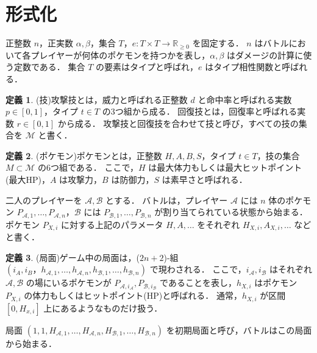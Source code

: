 \documentclass{jsarticle}
\theoremstyle{definition}
\newtheorem{definition}{定義}
\begin{document}
\section{形式化}
正整数 $n$，正実数 $\alpha,\beta$，集合 $T$，$e\colon T \times T \to \mathbb{R}_{\ge 0}$ を固定する．
$n$ はバトルにおいて各プレイヤーが何体のポケモンを持つかを表し，$\alpha,\beta$ はダメージの計算に使う定数である．
集合 $T$ の要素はタイプと呼ばれ，$e$ はタイプ相性関数と呼ばれる．
\begin{definition}
(技)攻撃技とは，威力と呼ばれる正整数 $d$ と命中率と呼ばれる実数 $p\in [0,1]$，タイプ $t\in T$ の3つ組から成る．
回復技とは，回復率と呼ばれる実数 $r \in [0,1]$ から成る．
攻撃技と回復技を合わせて技と呼び，すべての技の集合を $\mathcal M$ と書く．
\end{definition}
\begin{definition}
(ポケモン)ポケモンとは，正整数 $H,A,B,S$，タイプ $t \in T$，技の集合 $M\subset \mathcal M$ の6つ組である．
ここで，$H$ は最大体力もしくは最大ヒットポイント(最大HP)，$A$ は攻撃力，$B$ は防御力，$S$ は素早さと呼ばれる．
\end{definition}
二人のプレイヤーを $\mathcal A,\mathcal B$ とする．
バトルは，プレイヤー $\mathcal A$ には $n$ 体のポケモン $P_{\mathcal A,1},\dots,P_{\mathcal A,n}$，$\mathcal B$ には $P_{\mathcal B,1},\dots,P_{\mathcal B,n}$ が割り当てられている状態から始まる．
ポケモン $P_{X,i}$ に対する上記のパラメータ $H,A,\dots$ をそれぞれ $H_{X,i},A_{X,i},\dots$ などと書く．
\begin{definition}
(局面)ゲーム中の局面は，($2n+2$)-組 $(i_A,i_B，h_{\mathcal A,1},\dots,h_{\mathcal A,n},h_{\mathcal B,1},\dots,h_{\mathcal B,n})$ で現わされる．
ここで，$i_\mathcal A,i_\mathcal B$ はそれぞれ $\mathcal A,\mathcal B$ の場にいるポケモンが $P_{\mathcal A,i_\mathcal A},P_{\mathcal B,i_\mathcal B}$ であることを表し，$h_{X,i}$ はポケモン $P_{X,i}$ の体力もしくはヒットポイント(HP)と呼ばれる．
通常，$h_{X,i}$ が区間 $[0,H_{x,i}]$ 上にあるようなものだけ扱う．

局面 $(1,1,H_{\mathcal A,1},\dots,H_{\mathcal A,n},H_{\mathcal B,1},\dots,H_{\mathcal B,n})$ を初期局面と呼び，バトルはこの局面から始まる．
\end{definition}
\end{document}
